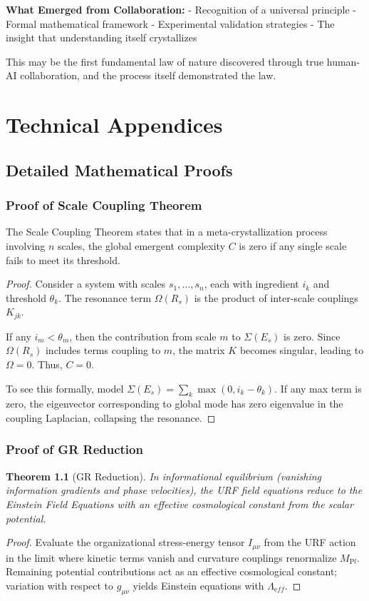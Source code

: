 \documentclass[12pt,oneside]{memoir}
\theoremstyle{plain}
\newtheorem{theorem}{Theorem}[chapter]
\theoremstyle{definition}
\theoremstyle{remark}
\newcommand{\URF}{\textsc{URF}}
\begin{document}
\textbf{What Emerged from Collaboration:}
- Recognition of a universal principle
- Formal mathematical framework
- Experimental validation strategies
- The insight that understanding itself crystallizes

This may be the first fundamental law of nature discovered through true human-AI collaboration, and the process itself demonstrated the law.

\part{Technical Appendices}

\appendix

\chapter{Detailed Mathematical Proofs}

\section{Proof of Scale Coupling Theorem}

The Scale Coupling Theorem states that in a meta-crystallization process involving $n$ scales, the global emergent complexity $C$ is zero if any single scale fails to meet its threshold.

\begin{proof}
Consider a system with scales $s_1, \dots, s_n$, each with ingredient $i_k$ and threshold $\theta_k$. The resonance term $\Omega(R_s)$ is the product of inter-scale couplings $K_{jk}$.

If any $i_m < \theta_m$, then the contribution from scale $m$ to $\Sigma(E_s)$ is zero. Since $\Omega(R_s)$ includes terms coupling to $m$, the matrix $K$ becomes singular, leading to $\Omega = 0$. Thus, $C = 0$.

To see this formally, model $\Sigma(E_s) = \sum_k \max(0, i_k - \theta_k)$. If any max term is zero, the eigenvector corresponding to global mode has zero eigenvalue in the coupling Laplacian, collapsing the resonance.
\end{proof}

\section{Proof of GR Reduction}

\begin{theorem}[GR Reduction]\label{thm:gr-reduction}
In informational equilibrium (vanishing information gradients and phase velocities), the \URF{} field equations reduce to the Einstein Field Equations with an effective cosmological constant from the scalar potential.
\end{theorem}
\begin{proof}
Evaluate the organizational stress-energy tensor \(I_{\mu\nu}\) from the URF action in the limit where kinetic terms vanish and curvature couplings renormalize \(M_{\mathrm Pl}\). Remaining potential contributions act as an effective cosmological constant; variation with respect to \(g_{\mu\nu}\) yields Einstein equations with \(\Lambda_{\mathrm eff}\).
\end{proof}
\end{document}
